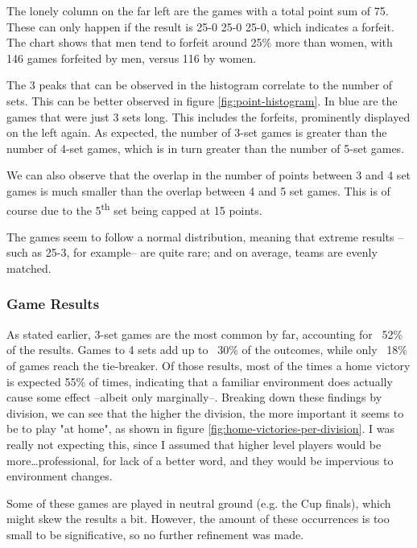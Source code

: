 The lonely column on the far left are the games with a total point sum of 75. These can only happen if the result is 25-0 25-0 25-0, which indicates a forfeit. The chart shows that men tend to forfeit around 25\% more than women, with 146 games forfeited by men, versus 116 by women.

The 3 peaks that can be observed in the histogram correlate to the number of sets. This can be better observed in figure \ref{fig:point-histogram}. In blue are the games that were just 3 sets long. This includes the forfeits, prominently displayed on the left again. As expected, the number of 3-set games is greater than the number of 4-set games, which is in turn greater than the number of 5-set games.

We can also observe that the overlap in the number of points between 3 and 4 set games is much smaller than the overlap between 4 and 5 set games. This is of course due to the 5\textsuperscript{th} set being capped at 15 points.

The games seem to follow a normal distribution, meaning that extreme results --such as 25-3, for example-- are quite rare; and on average, teams are evenly matched.

\subsubsection{Game Results}
As stated earlier, 3-set games are the most common by far, accounting for ~52\% of the results. Games to 4 sets add up to ~30\% of the outcomes, while only ~18\% of games reach the tie-breaker.
Of those results, most of the times a home victory is expected 55\% of times, indicating that a familiar environment does actually cause some effect --albeit only marginally--. Breaking down these findings by division, we can see that the higher the division, the more important it seems to be to play "at home", as shown in figure \ref{fig:home-victories-per-division}. I was really not expecting this, since I assumed that higher level players would be more\ldots professional, for lack of a better word, and they would be impervious to environment changes.

Some of these games are played in neutral ground (e.g. the Cup finals), which might skew the results a bit. However, the amount of these occurrences is too small to be significative, so no further refinement was made.

